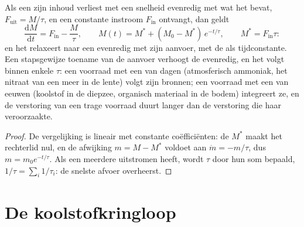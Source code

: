 \begin{theorem}\label{thm:b2:biogeochemical-cycles:box}
Als een  zijn inhoud verliest met een snelheid evenredig met wat het
bevat, $F_{\text{uit}} = M/\tau$, en een constante instroom
$F_{\text{in}}$ ontvangt, dan geldt
\[
\frac{\mathrm{d}M}{\mathrm{d}t} = F_{\text{in}} - \frac{M}{\tau},
\qquad
M(t) = M^{*} + (M_0 - M^{*})\,e^{-t/\tau}, \qquad M^{*} = F_{\text{in}}\tau :
\]
en het  relaxeert naar een  evenredig met zijn
aanvoer, met de  als tijdconstante. Een stapsgewijze toename van de
aanvoer verhoogt de  evenredig, en het  volgt
binnen enkele $\tau$: een voorraad met een  van dagen
(atmosferisch ammoniak, het nitraat van een meer in de lente) volgt zijn
bronnen; een voorraad met een  van eeuwen (koolstof in de diepzee,
organisch materiaal in de bodem) integreert ze, en de verstoring van een
trage voorraad duurt langer dan de verstoring die haar veroorzaakte.
\end{theorem}
\begin{proof}
De vergelijking is lineair met constante coëfficiënten: de 
$M^{*}$ maakt het rechterlid nul, en de afwijking $m = M - M^{*}$
voldoet aan $\dot m = -m/\tau$, dus $m = m_0 e^{-t/\tau}$. Als een 
meerdere uitstromen heeft, wordt $\tau$ door hun som bepaald, $1/\tau = \sum_i
1/\tau_i$: de snelste afvoer overheerst.
\end{proof}

\section{De koolstofkringloop}

